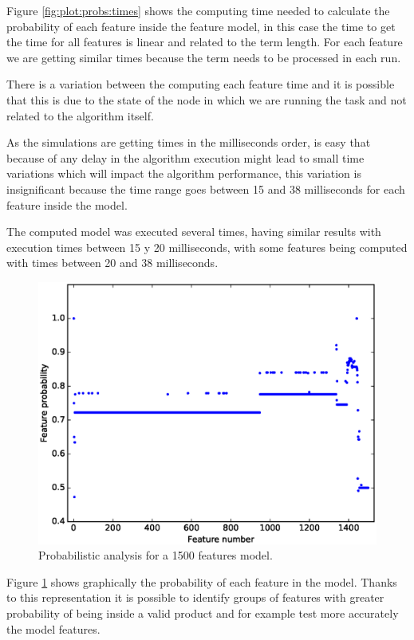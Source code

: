 Figure \ref{fig:plot:probs:times} shows the computing
time needed to calculate the probability of each feature
inside the feature model, in this case the time to get
the time for all features is linear and related to 
the term length.
For each feature we are getting similar times because the
term needs to be processed in each run.

There is a variation between the computing each
feature time and it is possible that this is due
to the state of the node in which we are running the task
and not related to the algorithm itself.

As the simulations are getting times in the milliseconds
order, is easy that because of any delay in the algorithm
execution might lead to small time variations which will
impact the algorithm performance, this variation is insignificant
because the time range goes between 15 and 38 milliseconds
for each feature inside the model.

The computed model was executed several times, having similar
results with execution times between 15 y 20 milliseconds, with
some features being computed with times between 20 and 38 milliseconds.

\begin{figure}[h]
	\centering
	\linefigure
	\includegraphics[width=0.8\hsize,angle=0]{plot_probs_probs.eps}
	\linefigure
	\caption{Probabilistic analysis for a 1500 features model.}\label{fig:plot:probs:probs}
\end{figure}

Figure \ref{fig:plot:probs:probs} shows graphically
the probability of each feature in the model.
Thanks to this representation it is possible to
identify groups of features with greater probability of
being inside a valid product and for example test
more accurately the model features.

